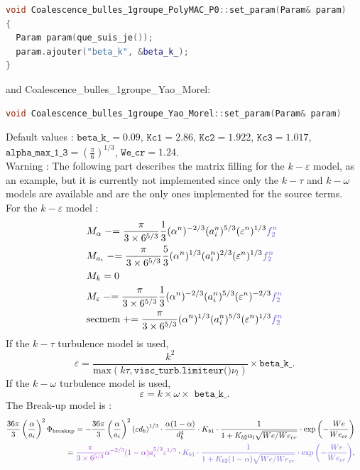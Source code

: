 \begin{lstlisting}[language=c++]
void Coalescence_bulles_1groupe_PolyMAC_P0::set_param(Param& param)
{
  Param param(que_suis_je());
  param.ajouter("beta_k", &beta_k_);
}
\end{lstlisting}
and {\color{myslateblue} Coalescence_bulles_1groupe_Yao_Morel}:
\begin{lstlisting}[language=c++]
void Coalescence_bulles_1groupe_Yao_Morel::set_param(Param& param)
\end{lstlisting}
Default values : $\texttt{beta\_k\_} = 0.09$, $\texttt{Kc1} = 2.86$, $\texttt{Kc2} = 1.922$, $\texttt{Kc3} = 1.017$,
$\texttt{alpha\_max\_1\_3} = (\frac{\pi}{6})^{1/3}$, $\texttt{We\_cr} = 1.24$.\\
{\color{red} Warning} : The following part describes the matrix filling for the $k-\varepsilon$ model, as an example, but it is currently not implemented since only the $k-\tau$ and $k-\omega$ models are available and are the only ones implemented for the source terms.\\
For the $k-\varepsilon$ model :
\begin{align}
    &M_{\alpha} \minuseq \frac{\pi}{3\times 6^{5/3}}\frac{1}{3}(\alpha^n)^{-2/3}(a_i^n)^{5/3}(\varepsilon^n)^{1/3} {\color{myslateblue} f_2^n}\\
    &M_{a_i} \minuseq \frac{\pi}{3\times 6^{5/3}}\frac{5}{3}(\alpha^n)^{1/3}(a_i^n)^{2/3}(\varepsilon^n)^{1/3} {\color{myslateblue} f_2^n}\\
    &M_{k}=0\\
    &M_{\varepsilon} \minuseq \frac{\pi}{3\times 6^{5/3}}\frac{1}{3}(\alpha^n)^{-2/3}(a_i^n)^{5/3}(\varepsilon^n)^{-2/3} {\color{myslateblue} f_2^n}\\
    &\text{secmem} \pluseq \frac{\pi}{3\times 6^{5/3}}(\alpha^n)^{1/3}(a_i^n)^{5/3}(\varepsilon^n)^{1/3} {\color{myslateblue} f_2^n}
\end{align}
If the $k-\tau$ turbulence model is used,
\begin{equation}
\varepsilon = \frac{k^2}{\text{max}(k\tau, \texttt{visc\_turb.limiteur()} \nu_l)}\times \texttt{beta\_k\_}.
\end{equation}
If the $k-\omega$ turbulence model is used,
\begin{equation}
\varepsilon = k \times \omega \times\texttt{ beta\_k\_}.
\end{equation}
The {\colorbox{codebackground}{\color{codekeyword3}  Break-up}} model is :
\begin{equation}
\begin{aligned}
		\frac{36\pi}{3}\parent{\frac{\alpha}{a_i}}^2\Phi_{\text{breakup}} =- \frac{36\pi}{3}\parent{\frac{\alpha}{a_i}}^2 \parent{\varepsilon d_b}^{1/3} \cdot \frac{\alpha(1-\alpha)}{d_b^4} \cdot K_{b1} \cdot \frac{1}{1 + K_{b2}\alpha_l \sqrt{We/We_{cr}}} \cdot \text{exp}\left(- \frac{We}{We_{cr}}\right)& & \\ = {\color{mydarkorchid} \frac{\pi}{3\times 6^{5/3}}\alpha^{-2/3}(1-\alpha)a_i^{5/3}\varepsilon^{1/3}} \cdot {\color{myslateblue} K_{b1} \cdot \frac{1}{1 + K_{b2}(1-\alpha) \sqrt{We/We_{cr}}} \cdot \text{exp}\left(- \frac{We}{We_{cr}}\right)},
\end{aligned}
\end{equation}
